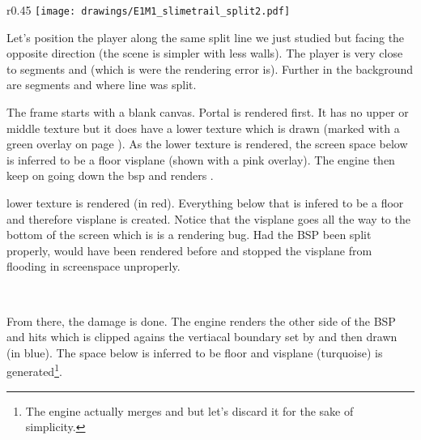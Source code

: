 \begin{minipage}{0.47\textwidth}
\end{minipage}
\hspace{4mm}
\begin{minipage}{0.47\textwidth}
\end{minipage} 
\par
\vspace{1mm}
\par



\par
\begin{wrapfigure}[22]{r}{0.45\textwidth}
\centering
\texttt{[image: drawings/E1M1\_slimetrail\_split2.pdf]}
\end{wrapfigure}
Let's position the player along the same split line we just studied but facing the opposite direction (the scene is simpler with less walls). The player is very close to segments  and  (which is were the rendering error is). Further in the background are segments  and  where line  was split.\\
\par
The frame starts with a blank canvas. Portal  is rendered first. It has no upper or middle texture but it does have a lower texture which is drawn (marked with a green overlay on page \pageref{leak_opposite_explained.png}). As the lower texture is rendered, the screen space below is inferred to be a floor visplane  (shown with a pink overlay). The engine then keep on going down the bsp and renders .\\
\par

  lower texture is rendered (in red). Everything below that is infered to be a floor and therefore visplane  is created. Notice that the visplane goes all the way to the bottom of the screen which is is a rendering bug. Had the BSP been split properly,  would have been rendered before  and stopped the visplane from flooding in screenspace unproperly.\\
\par
 

\\
\label{leak_opposite_explained.png}
\par
From there, the damage is done. The engine renders the other side of the BSP and hits  which is clipped agains the vertiacal boundary set by  and then drawn (in blue). The space below  is inferred to be floor and visplane  (turquoise) is generated\footnote{The engine actually merges  and  but let's discard it for the sake of simplicity.}.
